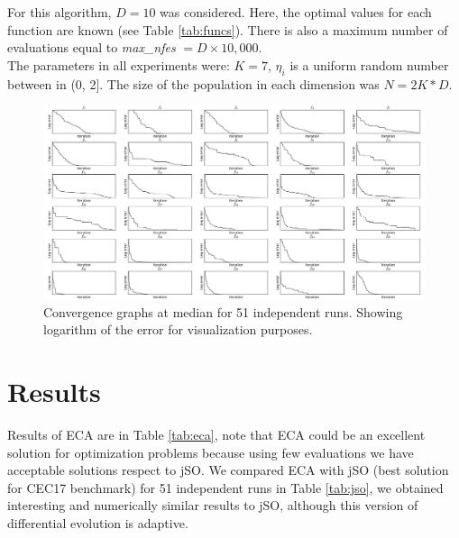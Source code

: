 \documentclass[graybox]{svmult}
\begin{document}
For this algorithm, $D = 10$ was considered. Here, the optimal values for each function are known (see Table \ref{tab:funcs}). There is also a maximum number of evaluations equal to \textit{max\_nfes} $= D \times 10,000$.\\

The parameters in all experiments were: $K = 7$, $\eta_i$ is a uniform random number between in (0, 2]. The size of the population in each dimension was $N = 2K * D $.




\begin{figure}[b]
\includegraphics[width=\linewidth]{img/converg.pdf}
\caption{Convergence graphs at median for 51 independent runs. Showing logarithm of the error for visualization purposes.}
\label{fig:converg}       %
\end{figure}




\section{Results} %
\label{sec:results}

Results of ECA are in Table \ref{tab:eca}, note that ECA could be an excellent solution for optimization problems because using few evaluations we have acceptable solutions respect to jSO. We compared ECA with jSO (best solution for CEC17 benchmark) for 51 independent runs in Table \ref{tab:jso}, we obtained interesting and numerically similar results to jSO, although this version of differential evolution is adaptive.\\
\end{document}
